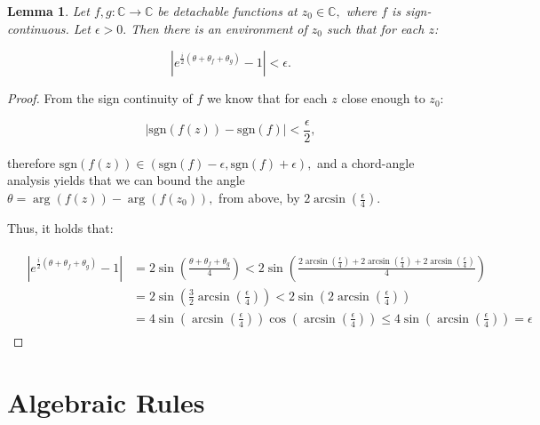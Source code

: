 \documentclass[11pt]{book}
\newtheorem{lem}[thm]{Lemma}
\begin{document}
\begin{lem}\label{theta_theta_fg_upper_bound}Let $f,g:\mathbb{C}\longrightarrow\mathbb{C}$ be detachable functions at $z_{0}\in\mathbb{C},$ where $f$ is sign-continuous. Let $\epsilon>0.$ Then there is an environment of $z_{0}$ such that for each $z$:

$$\left|e^{\frac{i}{2}\left(\theta+\theta_{f}+\theta_{g}\right)}-1\right|<\epsilon.$$
\end{lem}
\begin{proof}From the sign continuity of $f$ we know that for each $z$ close enough to $z_{0}$:

$$\left|\text{sgn}\left(f\left(z\right)\right)-\text{sgn}\left(f\right)\right|<\frac{\epsilon}{2},$$

therefore $\text{sgn}\left(f\left(z\right)\right)\in\left(\text{sgn}\left(f\right)-\epsilon,\text{sgn}\left(f\right)+\epsilon\right),$ and a chord-angle analysis yields that we can bound the angle $\theta=\arg\left(f\left(z\right)\right)-\arg\left(f\left(z_{0}\right)\right),$ from above, by $2\arcsin\left(\frac{\epsilon}{4}\right).$

Thus, it holds that:


\begin{align}
&\begin{aligned}
\left|e^{\frac{i}{2}\left(\theta+\theta_{f}+\theta_{g}\right)}-1\right| &=2\sin\left(\frac{\theta+\theta_{f}+\theta_{g}}{4}\right)<2\sin\left(\frac{2\arcsin\left(\frac{\epsilon}{4}\right)+2\arcsin\left(\frac{\epsilon}{4}\right)+2\arcsin\left(\frac{\epsilon}{4}\right)}{4}\right) \\
&=2\sin\left(\frac{3}{2}\arcsin\left(\frac{\epsilon}{4}\right)\right)
<2\sin\left(2\arcsin\left(\frac{\epsilon}{4}\right)\right) \\
&=4\sin\left(\arcsin\left(\frac{\epsilon}{4}\right)\right)\cos\left(\arcsin\left(\frac{\epsilon}{4}\right)\right)\leq4\sin\left(\arcsin\left(\frac{\epsilon}{4}\right)\right)=\epsilon
\end{aligned}
\end{align}
\end{proof}

\section{Algebraic Rules}
\end{document}
